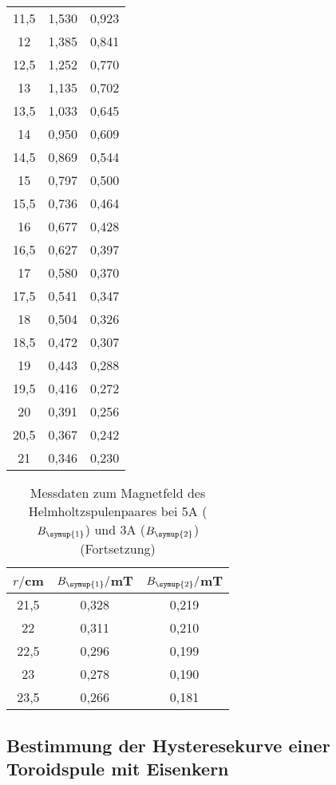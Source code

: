 \begin{table}
\begin{tabular}{c c c}
    11,5	&  1,530 & 0,923\\
    12	  &  1,385 & 0,841\\
    12,5	&  1,252 & 0,770\\
    13	  &  1,135 & 0,702\\
    13,5	&  1,033 & 0,645\\
    14	  &  0,950 & 0,609\\
    14,5	&  0,869 & 0,544\\
    15	  &  0,797 & 0,500\\
    15,5	&  0,736 & 0,464\\
    16	  &  0,677 & 0,428\\
    16,5	&  0,627 & 0,397\\
    17	  &  0,580 & 0,370\\
    17,5	&  0,541 & 0,347\\
    18	  &  0,504 & 0,326\\
    18,5	&  0,472 & 0,307\\
    19	  &  0,443 & 0,288\\
    19,5	&  0,416 & 0,272\\
    20	  &  0,391 & 0,256\\
    20,5	&  0,367 & 0,242\\
    21	  &  0,346 & 0,230\\
    \bottomrule
  \end{tabular}
\end{table}

\begin{table}
  \centering
  \caption{Messdaten zum Magnetfeld des Helmholtzspulenpaares bei 5A ($B_{\symup{1}}$)
  und 3A ($B_{\symup{2}}$)(Fortsetzung)}
  \label{tab:helmholtz_f}
  \begin{tabular}{c c c}
    \toprule
    $r/$cm & $B_{\symup{1}}/$mT & $B_{\symup{2}}/$mT\\
    \midrule
    21,5	&  0,328 & 0,219\\
    22	  &  0,311 & 0,210\\
    22,5	&  0,296 & 0,199\\
    23	  &  0,278 & 0,190\\
    23,5	&  0,266 & 0,181\\
    \bottomrule
  \end{tabular}
\end{table}


\newpage
\subsection{Bestimmung der Hysteresekurve einer Toroidspule mit Eisenkern}

